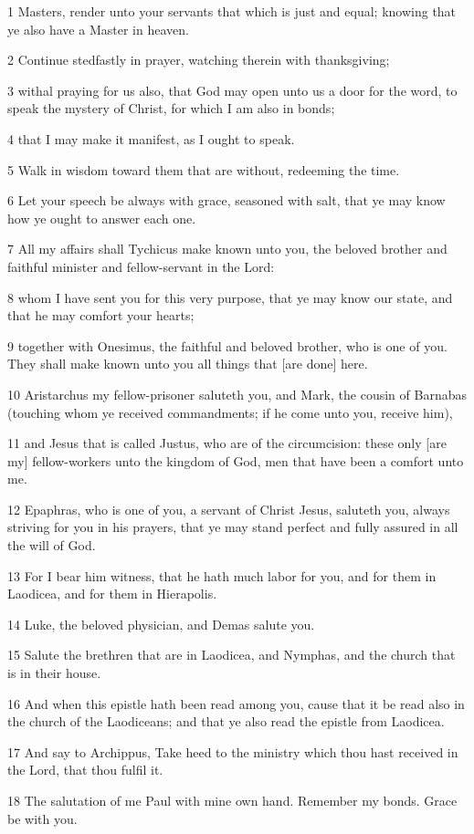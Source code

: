 \par 1 Masters, render unto your servants that which is just and equal; knowing that ye also have a Master in heaven.
\par 2 Continue stedfastly in prayer, watching therein with thanksgiving;
\par 3 withal praying for us also, that God may open unto us a door for the word, to speak the mystery of Christ, for which I am also in bonds;
\par 4 that I may make it manifest, as I ought to speak.
\par 5 Walk in wisdom toward them that are without, redeeming the time.
\par 6 Let your speech be always with grace, seasoned with salt, that ye may know how ye ought to answer each one.
\par 7 All my affairs shall Tychicus make known unto you, the beloved brother and faithful minister and fellow-servant in the Lord:
\par 8 whom I have sent you for this very purpose, that ye may know our state, and that he may comfort your hearts;
\par 9 together with Onesimus, the faithful and beloved brother, who is one of you. They shall make known unto you all things that [are done] here.
\par 10 Aristarchus my fellow-prisoner saluteth you, and Mark, the cousin of Barnabas (touching whom ye received commandments; if he come unto you, receive him),
\par 11 and Jesus that is called Justus, who are of the circumcision: these only [are my] fellow-workers unto the kingdom of God, men that have been a comfort unto me.
\par 12 Epaphras, who is one of you, a servant of Christ Jesus, saluteth you, always striving for you in his prayers, that ye may stand perfect and fully assured in all the will of God.
\par 13 For I bear him witness, that he hath much labor for you, and for them in Laodicea, and for them in Hierapolis.
\par 14 Luke, the beloved physician, and Demas salute you.
\par 15 Salute the brethren that are in Laodicea, and Nymphas, and the church that is in their house.
\par 16 And when this epistle hath been read among you, cause that it be read also in the church of the Laodiceans; and that ye also read the epistle from Laodicea.
\par 17 And say to Archippus, Take heed to the ministry which thou hast received in the Lord, that thou fulfil it.
\par 18 The salutation of me Paul with mine own hand. Remember my bonds. Grace be with you.

